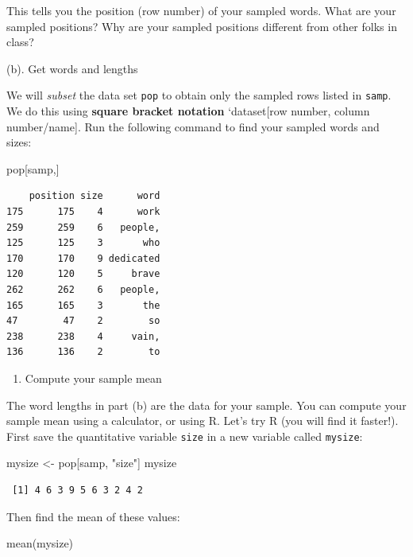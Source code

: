 \documentclass[
]{book}
\newenvironment{Shaded}{\begin{snugshade}}{\end{snugshade}}
\newcommand{\FunctionTok}[1]{\textcolor[rgb]{0.00,0.00,0.00}{#1}}
\newcommand{\NormalTok}[1]{#1}
\newcommand{\OtherTok}[1]{\textcolor[rgb]{0.56,0.35,0.01}{#1}}
\newcommand{\StringTok}[1]{\textcolor[rgb]{0.31,0.60,0.02}{#1}}
\providecommand{\tightlist}{%
  \setlength{\itemsep}{0pt}\setlength{\parskip}{0pt}}
\begin{document}
This tells you the position (row number) of your sampled words. What are your sampled positions? Why are your sampled positions different from other folks in class?

(b). Get words and lengths

We will \emph{subset} the data set \texttt{pop} to obtain only the sampled rows listed in \texttt{samp}. We do this using \textbf{square bracket notation} `dataset{[}row number, column number/name{]}. Run the following command to find your sampled words and sizes:

\begin{Shaded}
\begin{Highlighting}[]
\NormalTok{pop[samp,]}
\end{Highlighting}
\end{Shaded}

\begin{verbatim}
    position size      word
175      175    4      work
259      259    6   people,
125      125    3       who
170      170    9 dedicated
120      120    5     brave
262      262    6   people,
165      165    3       the
47        47    2        so
238      238    4     vain,
136      136    2        to
\end{verbatim}

\begin{enumerate}
\def\labelenumi{\alph{enumi}.}
\setcounter{enumi}{2}
\tightlist
\item
  Compute your sample mean
\end{enumerate}

The word lengths in part (b) are the data for your sample. You can compute your sample mean using a calculator, or using R. Let's try R (you will find it faster!). First save the quantitative variable \texttt{size} in a new variable called \texttt{mysize}:

\begin{Shaded}
\begin{Highlighting}[]
\NormalTok{mysize }\OtherTok{\textless{}{-}}\NormalTok{ pop[samp, }\StringTok{"size"}\NormalTok{]}
\NormalTok{mysize}
\end{Highlighting}
\end{Shaded}

\begin{verbatim}
 [1] 4 6 3 9 5 6 3 2 4 2
\end{verbatim}

Then find the mean of these values:

\begin{Shaded}
\begin{Highlighting}[]
\FunctionTok{mean}\NormalTok{(mysize)}
\end{Highlighting}
\end{Shaded}
\end{document}
